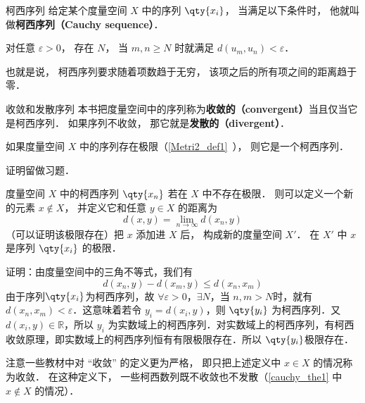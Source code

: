 

\begin{definition}{柯西序列}
给定某个度量空间 $X$ 中的序列 $\qty{x_i}$， 当满足以下条件时， 他就叫做\textbf{柯西序列（Cauchy sequence）}．

对任意 $\varepsilon > 0$， 存在 $N$， 当 $m, n \geqslant N$ 时就满足 $d(u_m, u_n) < \varepsilon$．
\end{definition}
也就是说， 柯西序列要求随着项数趋于无穷， 该项之后的所有项之间的距离趋于零．

\begin{definition}{收敛和发散序列}\label{cauchy_def1}
本书把度量空间中的序列称为\textbf{收敛的（convergent）}当且仅当它是柯西序列． 如果序列不收敛， 那它就是\textbf{发散的（divergent）}．
\end{definition}

\begin{theorem}{}
如果度量空间 $X$ 中的序列存在极限（\autoref{Metri2_def1}~）， 则它是一个柯西序列．
\end{theorem}
证明留做习题．

\begin{theorem}{}\label{cauchy_the1}
度量空间 $X$ 中的柯西序列 $\qty{x_n}$ 若在 $X$ 中不存在极限． 则可以定义一个新的元素 $x \notin X$， 并定义它和任意 $y\in X$ 的距离为
\begin{equation}
d(x, y) = \lim_{n\to\infty} d(x_n, y)
\end{equation}
（可以证明该极限存在）把 $x$ 添加进 $X$ 后， 构成新的度量空间 $X'$． 在 $X'$ 中 $x$ 是序列 $\qty{x_i}$ 的极限．
\end{theorem}
证明：由度量空间中的三角不等式，我们有
\begin{equation}
d(x_n,y)-d(x_m,y)\leq d(x_n,x_m)
\end{equation}
由于序列$\qty{x_i}$为柯西序列，故 $\forall\varepsilon>0$，$\exists N$，当 $n,m>N$时，就有 $d(x_n,x_m)<\varepsilon$．这意味着若令 $y_i=d(x_i,y)$，则 $\qty{y_i}$ 为柯西序列．又 $d(x_i,y)\in \mathbb R$，所以 ${y_i}$ 为实数域上的柯西序列．对实数域上的柯西序列，有柯西收敛原理，即实数域上的柯西序列恒有有限极限存在．所以 $\qty{y_i}$极限存在．

注意一些教材中对 “收敛” 的定义更为严格， 即只把上述定义中 $x \in X$ 的情况称为收敛． 在这种定义下， 一些柯西数列既不收敛也不发散（\autoref{cauchy_the1} 中 $x\notin X$ 的情况）．

